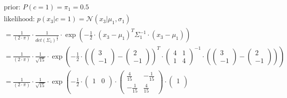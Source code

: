 \documentclass[12pt]{article}
\begin{document}
\begin{enumerate}
\begin{itemize}[label=]
            \begin{equation*}
                \begin{aligned}
                    &\text{prior: } P(c=1) = \pi_1 = \mathbf{0.5} \\
                    &\text{likelihood: } p(x_3|c=1) = \mathcal{N}(x_3| \mu_1, \sigma_1) \\
                    &= \frac{1}{(2 \cdot \pi)} \cdot \frac{1}{det(\Sigma_1)^\frac{1}{2}} \cdot \exp \left( -\frac{1}{2} \cdot (x_3 - \mu_1)^{T} \Sigma_1^{-1} \cdot (x_3 - \mu_1) \right)\\
                    &= \frac{1}{(2 \cdot \pi)} \cdot \frac{1}{\sqrt{15}} \cdot \exp \left( -\frac{1}{2} \cdot \left(\begin{pmatrix}
                    3\\
                    -1
                    \end{pmatrix} - \begin{pmatrix}
                    2\\
                    -1
                    \end{pmatrix}\right)^{T} \cdot \begin{pmatrix}
                    4 & 1\\
                    1 & 4
                    \end{pmatrix}^{-1} \cdot \left(\begin{pmatrix}
                    3\\
                    -1
                    \end{pmatrix} - \begin{pmatrix}
                    2\\
                    -1
                    \end{pmatrix}\right) \right)\\
                    &= \frac{1}{(2 \cdot \pi)} \cdot \frac{1}{\sqrt{15}} \cdot \exp \left( -\frac{1}{2} \cdot \begin{pmatrix}
                    1 & 0\\
                    \end{pmatrix} \cdot \begin{pmatrix}
                    \frac{4}{15} & -\frac{1}{15}\\
                    -\frac{1}{15} & \frac{4}{15}
                    \end{pmatrix} \cdot \begin{pmatrix}
                    1\\

\end{pmatrix}
\end{aligned}
\end{equation*}
\end{itemize}
\end{enumerate}
\end{document}
